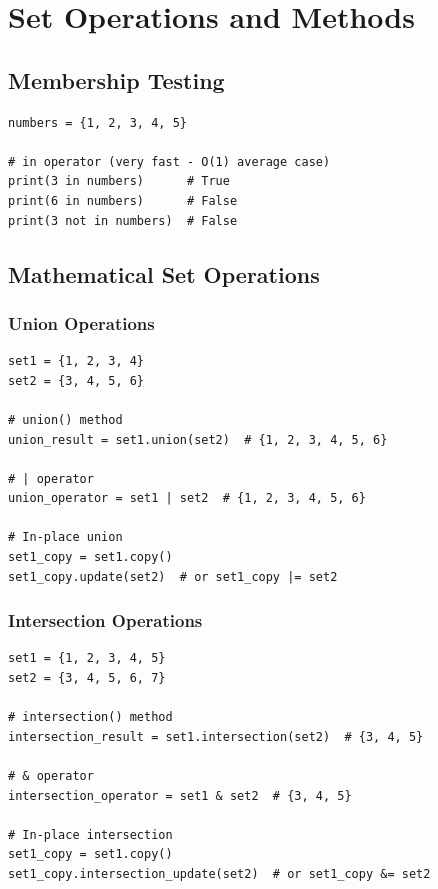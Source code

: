 \documentclass[12pt,a4paper]{article}
\begin{document}
\section{Set Operations and Methods}

\subsection{Membership Testing}

\begin{lstlisting}
numbers = {1, 2, 3, 4, 5}

# in operator (very fast - O(1) average case)
print(3 in numbers)      # True
print(6 in numbers)      # False
print(3 not in numbers)  # False
\end{lstlisting}

\subsection{Mathematical Set Operations}

\subsubsection{Union Operations}

\begin{lstlisting}
set1 = {1, 2, 3, 4}
set2 = {3, 4, 5, 6}

# union() method
union_result = set1.union(set2)  # {1, 2, 3, 4, 5, 6}

# | operator
union_operator = set1 | set2  # {1, 2, 3, 4, 5, 6}

# In-place union
set1_copy = set1.copy()
set1_copy.update(set2)  # or set1_copy |= set2
\end{lstlisting}

\subsubsection{Intersection Operations}

\begin{lstlisting}
set1 = {1, 2, 3, 4, 5}
set2 = {3, 4, 5, 6, 7}

# intersection() method
intersection_result = set1.intersection(set2)  # {3, 4, 5}

# & operator
intersection_operator = set1 & set2  # {3, 4, 5}

# In-place intersection
set1_copy = set1.copy()
set1_copy.intersection_update(set2)  # or set1_copy &= set2
\end{lstlisting}
\end{document}
